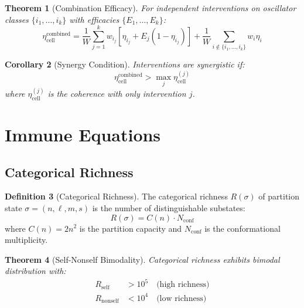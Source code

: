 \documentclass[10pt,twocolumn]{article}
\theoremstyle{plain}
\newtheorem{theorem}{Theorem}[section]
\newtheorem{corollary}[theorem]{Corollary}
\theoremstyle{definition}
\newtheorem{definition}[theorem]{Definition}
\theoremstyle{remark}
\newcommand{\etacell}{\eta_{\mathrm{cell}}}
\begin{document}
\begin{theorem}[Combination Efficacy]
\label{thm:combination}
For independent interventions on oscillator classes $\{i_1, \ldots, i_k\}$ with efficacies $\{E_1, \ldots, E_k\}$:
\begin{equation}
\etacell^{\mathrm{combined}} = \frac{1}{W}\sum_{j=1}^{k} w_{i_j}[\eta_{i_j} + E_j(1 - \eta_{i_j})] + \frac{1}{W}\sum_{i \notin \{i_1,\ldots,i_k\}} w_i \eta_i
\label{eq:combination}
\end{equation}
\end{theorem}

\begin{corollary}[Synergy Condition]
\label{cor:synergy}
Interventions are synergistic if:
\begin{equation}
\etacell^{\mathrm{combined}} > \max_j \etacell^{(j)}
\end{equation}
where $\etacell^{(j)}$ is the coherence with only intervention $j$.
\end{corollary}

\section{Immune Equations}
\label{sec:immune}

\subsection{Categorical Richness}

\begin{definition}[Categorical Richness]
\label{def:richness}
The categorical richness $R(\sigma)$ of partition state $\sigma = (n, \ell, m, s)$ is the number of distinguishable substates:
\begin{equation}
R(\sigma) = C(n) \cdot N_{\mathrm{conf}}
\label{eq:richness}
\end{equation}
where $C(n) = 2n^2$ is the partition capacity and $N_{\mathrm{conf}}$ is the conformational multiplicity.
\end{definition}

\begin{theorem}[Self-Nonself Bimodality]
\label{thm:bimodality}
Categorical richness exhibits bimodal distribution with:
\begin{align}
R_{\mathrm{self}} &> 10^5 \quad \text{(high richness)} \\
R_{\mathrm{nonself}} &< 10^4 \quad \text{(low richness)}
\end{align}
\end{theorem}
\end{document}
